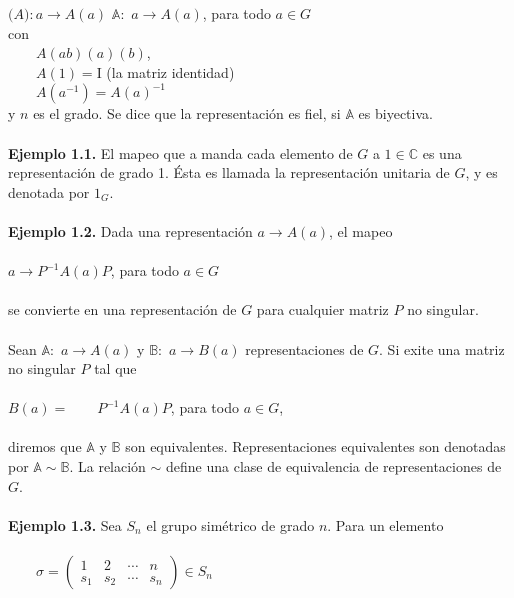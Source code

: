 \documentclass[12pt]{book}
\theoremstyle{definition}
\newcounter{in}
\begin{document}
$\mathbb(A):a\rightarrow A\left(a\right)$
$\mathbb{A}:$ $a\rightarrow A\left(a\right)$, para todo $a\in G$\\
con\\
$\qquad A\left(ab\right)\left(a\right)\left(b\right)$,\\
$\qquad A\left(1\right)=\mathrm{I}$ (la matriz identidad)\\
$\qquad A\left(a^{-1}\right)=A\left(a\right)^{-1}$ \\
y $n$ es el grado. Se dice que la representación es fiel, si $\mathbb{A}$ es biyectiva.\\~\\
\textbf{Ejemplo 1.1.} El mapeo que a manda cada elemento de $G$ a $1 \in \mathbb{C}$ es una representación de grado 1. Ésta es llamada la representación unitaria de $G$, y es denotada por $1_{G}$.\\~\\
\textbf{Ejemplo 1.2.} Dada una representación $a \rightarrow A\left(a\right)$, el mapeo\\~\\
$a \rightarrow P^{-1}A\left(a\right)P$, para todo $a \in G$\\~\\
se convierte en una representación de $G$ para cualquier matriz $P$ no singular.\\~\\
Sean $\mathbb{A}:$ $a\rightarrow A\left(a\right)$ y $\mathbb{B}:$ $a\rightarrow B\left(a\right)$ representaciones de $G$. Si exite una matriz no singular $P$ tal que \\~\\
$B\left(a\right)=\qquad P^{-1}A\left(a\right)P$, para todo $a \in G$,\\~\\
diremos que $\mathbb{A}$ y $\mathbb{B}$ son equivalentes. Representaciones equivalentes son denotadas por $\mathbb{A} \sim \mathbb{B}$. La relación $\sim$ define una clase de equivalencia de representaciones de $G$.\\~\\
\textbf{Ejemplo 1.3.} Sea $S_{n}$ el grupo simétrico de grado $n$. Para un elemento\\~\\
$\qquad 
\sigma = 
\begin{pmatrix}
1 & 2 & \cdots  & n\\ 
s_{1} & s_{2} & \cdots & s_{n}
\end{pmatrix} 
\in S_{n}$\\~\\
\end{document}
